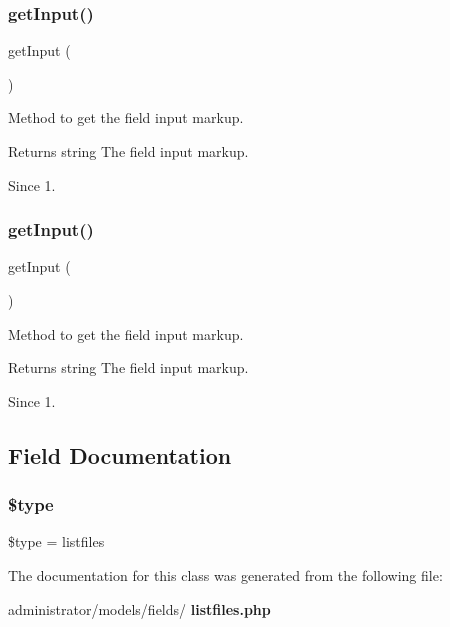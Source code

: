 \subsubsection{get\+Input()\hspace{0.1cm}{\footnotesize\ttfamily [1/2]}}
{\footnotesize\ttfamily get\+Input (\begin{DoxyParamCaption}{ }\end{DoxyParamCaption})\hspace{0.3cm}{\ttfamily [protected]}}

Method to get the field input markup.

\begin{DoxyReturn}{Returns}
string The field input markup.
\end{DoxyReturn}
\begin{DoxySince}{Since}
1. 
\end{DoxySince}
\mbox{\label{class_j_form_field_list_files_a4380f30ae9202fa49ebd2439572f9cdb}} 
\subsubsection{get\+Input()\hspace{0.1cm}{\footnotesize\ttfamily [2/2]}}
{\footnotesize\ttfamily get\+Input (\begin{DoxyParamCaption}{ }\end{DoxyParamCaption})\hspace{0.3cm}{\ttfamily [protected]}}

Method to get the field input markup.

\begin{DoxyReturn}{Returns}
string The field input markup.
\end{DoxyReturn}
\begin{DoxySince}{Since}
1. 
\end{DoxySince}


\subsection{Field Documentation}
\mbox{\label{class_j_form_field_list_files_a9a4a6fba2208984cabb3afacadf33919}} 
\subsubsection{\$type}
{\footnotesize\ttfamily \$type = \textquotesingle{}listfiles\textquotesingle{}\hspace{0.3cm}{\ttfamily [protected]}}



The documentation for this class was generated from the following file\+:\begin{DoxyCompactItemize}
\item 
administrator/models/fields/\textbf{ listfiles.\+php}\end{DoxyCompactItemize}
